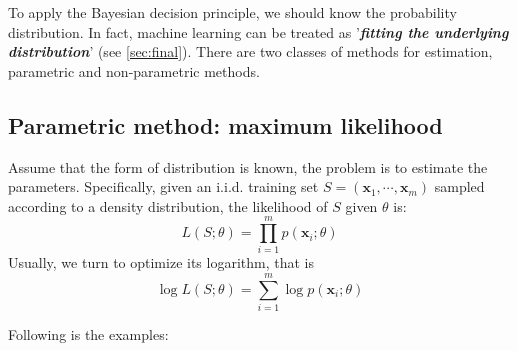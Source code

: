 \documentclass{article}
\begin{document}
	To apply the Bayesian decision principle, we should know the probability distribution. In fact, machine learning can be treated as '\textbf{\textit{fitting the underlying distribution}}' (see \ref{sec:final}). There are two classes of methods for estimation, parametric and non-parametric methods.
	
	\subsection{Parametric method: maximum likelihood}
	Assume that the form of distribution is known, the problem is to estimate the parameters. Specifically, given an i.i.d. training set $S = (\bm{x}_1,\cdots,\bm{x}_m)$ sampled according to a density distribution, the likelihood of $S$ given $\theta$ is:
	\begin{equation*}
	L(S;\theta) = \prod_{i=1}^m  p(\bm{x}_i;\theta)
	\end{equation*}
Usually, we turn to optimize its logarithm, that is
	\begin{equation}
	\log L(S;\theta) = \sum_{i=1}^m \log p(\bm{x}_i;\theta)
	\end{equation}
	
	Following is the examples:
	
\end{document}
